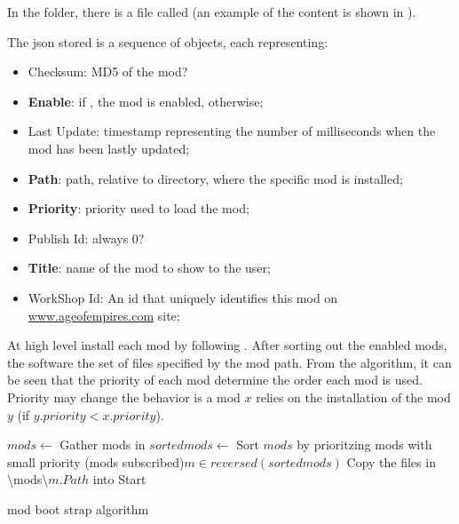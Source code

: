 In the  folder, there is a file called  (an example of the content is shown in ).



The json stored is a sequence of objects, each representing:

\begin{itemize}
    \item Checksum: MD5 of the mod?
    \item \textbf{Enable}: if \true{}, the mod is enabled, \false{} otherwise;
    \item Last Update: timestamp representing the number of milliseconds when the mod has been lastly updated;
    \item \textbf{Path}: path, relative to \aoeweirdnumberdir{} directory, where the specific mod is installed;
    \item \textbf{Priority}: priority used to load the mod;
    \item Publish Id: always 0?
    \item \textbf{Title}: name of the mod to show to the user;
    \item WorkShop Id: An id that uniquely identifies this mod on \url{www.ageofempires.com} site;
\end{itemize}


At high level \aoe{} install each mod by following . 
After sorting out the enabled mods, the software  the set of files specified by the mod path.
From the algorithm, it can be seen that the priority of each mod determine the order each mod is used. Priority may change the behavior is a mod $x$ relies on the installation of the mod $y$ (if $y.priority < x.priority$)\cite{Ozhara:2017}.

\begin{algorithm}
    \SetAlgoLined
    $mods \leftarrow$ Gather mods in \aoeweirdnumberdir{}\;
    $sortedmods \leftarrow$ Sort $mods$ by prioritzing mods with small priority\;
    \ForEach(mods subscribed){$m \in reversed(sortedmods)$}{
        Copy the files in \aoeweirdnumberdir{}\textbackslash{}mods\textbackslash{}$m.Path$ into \aoeexedir{}\;
    }
    Start \aoe{}\;
    \caption{\aoe{} mod boot strap algorithm}
    \label{alg:bootstrap}
\end{algorithm}